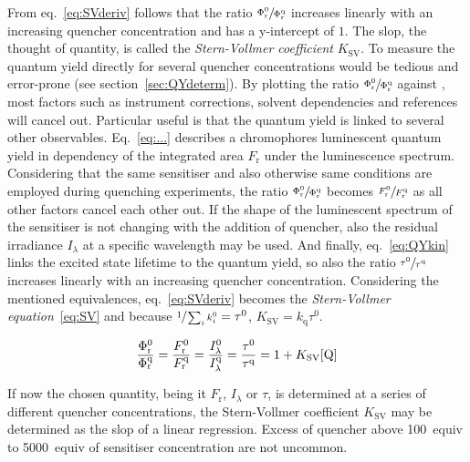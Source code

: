 	From eq.~\ref{eq:SVderiv} follows that the ratio $\sfrac{\Phi^0_\mathrm{r}}{\Phi^\mathrm{q}_\mathrm{r}}$ increases linearly with an increasing quencher concentration \ce{[Q]} and has a y-intercept of $1$. The slop, the thought of quantity, is called the \emph{Stern-Vollmer coefficient} $K_\mathrm{SV}$. To measure the quantum yield directly for several quencher concentrations would be tedious and error-prone (see section~\ref{sec:QYdeterm}). By plotting the ratio $\sfrac{\Phi^0_\mathrm{r}}{\Phi^\mathrm{q}_\mathrm{r}}$ against \ce{[Q]}, most factors such as instrument corrections, solvent dependencies and references will cancel out. Particular useful is that the quantum yield is linked to several other observables. Eq.~\ref{eq:...} describes a chromophores luminescent quantum yield in dependency of the integrated area $F_\mathrm{r}$ under the luminescence spectrum. Considering that the same sensitiser and also otherwise same conditions are employed during quenching experiments, the ratio $\sfrac{\Phi^0_\mathrm{r}}{\Phi^\mathrm{q}_\mathrm{r}}$ becomes $\sfrac{F^0_\mathrm{r}}{F^\mathrm{q}_\mathrm{r}}$ as all other factors cancel each other out. If the shape of the luminescent spectrum of the sensitiser is not changing with the addition of quencher, also the residual irradiance $I_\lambda$ at a specific wavelength may be used. And finally, eq.~\ref{eq:QYkin} links the excited state lifetime to the quantum yield, so also the ratio $\sfrac{\tau^0}{\tau^\mathrm{q}}$ increases linearly with an increasing quencher concentration. Considering the mentioned equivalences, eq.~\ref{eq:SVderiv} becomes the \emph{Stern-Vollmer equation}~\ref{eq:SV} and because $\sfrac{1}{\sum_i k^0_i} = \tau^0$, $K_\mathrm{SV} = k_\mathrm{q}\tau^0$.

	\begin{equation}
	\label{eq:SV}
		\frac{\Phi^0_\mathrm{r}}{\Phi^\mathrm{q}_\mathrm{r}} = \frac{F^0_\mathrm{r}}{F^\mathrm{q}_\mathrm{r}} = \frac{I^0_\lambda}{I^\mathrm{q}_\lambda} = \frac{\tau^0}{\tau^\mathrm{q}} = 1 + K_\mathrm{SV}\ce{[Q]}
	\end{equation}

	If now the chosen quantity, being it $F_\mathrm{r}$, $I_\lambda$ or $\tau$, is determined at a series of different quencher concentrations, the Stern-Vollmer coefficient $K_\mathrm{SV}$ may be determined as the slop of a linear regression. Excess of quencher above \qty{100}{equiv} to \qty{5000}{equiv} of sensitiser concentration are not uncommon.


